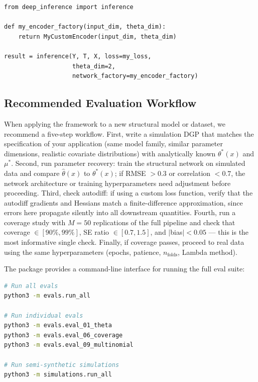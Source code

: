 \begin{lstlisting}
from deep_inference import inference

def my_encoder_factory(input_dim, theta_dim):
    return MyCustomEncoder(input_dim, theta_dim)

result = inference(Y, T, X, loss=my_loss,
                   theta_dim=2,
                   network_factory=my_encoder_factory)
\end{lstlisting}

\subsection{Recommended Evaluation Workflow}\label{sec:eval_workflow}

When applying the framework to a new structural model or dataset, we recommend a five-step workflow. First, write a simulation DGP that matches the specification of your application (same model family, similar parameter dimensions, realistic covariate distributions) with analytically known $\theta^*(x)$ and $\mu^*$. Second, run parameter recovery: train the structural network on simulated data and compare $\hat{\theta}(x)$ to $\theta^*(x)$; if RMSE $> 0.3$ or correlation $< 0.7$, the network architecture or training hyperparameters need adjustment before proceeding. Third, check autodiff: if using a custom loss function, verify that the autodiff gradients and Hessians match a finite-difference approximation, since errors here propagate silently into all downstream quantities. Fourth, run a coverage study with $M = 50$ replications of the full pipeline and check that coverage $\in [90\%, 99\%]$, SE ratio $\in [0.7, 1.5]$, and $|$bias$| < 0.05$ --- this is the most informative single check. Finally, if coverage passes, proceed to real data using the same hyperparameters (epochs, patience, $n_{\text{folds}}$, Lambda method).

The package provides a command-line interface for running the full eval suite:

\begin{lstlisting}[language=bash,numbers=none]
# Run all evals
python3 -m evals.run_all

# Run individual evals
python3 -m evals.eval_01_theta
python3 -m evals.eval_06_coverage
python3 -m evals.eval_09_multinomial

# Run semi-synthetic simulations
python3 -m simulations.run_all
\end{lstlisting}
